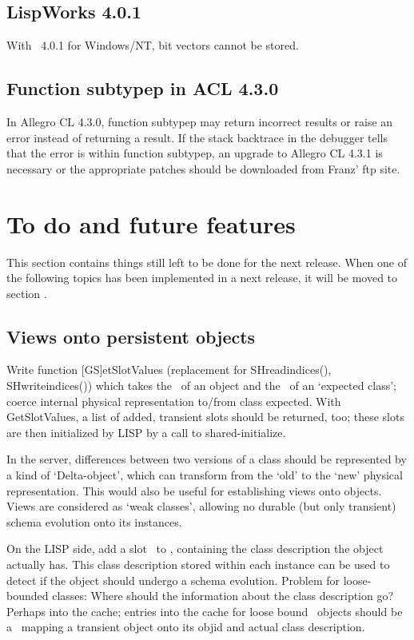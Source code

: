 \subsection{LispWorks 4.0.1}

With \lwcl\ 4.0.1 for Windows/NT, bit vectors cannot be stored.

\subsection{Function subtypep in ACL 4.3.0}

In Allegro CL 4.3.0, function subtypep may return incorrect results or
raise an error instead of returning a result. If the stack backtrace
in the debugger tells that the error is within function subtypep,
an upgrade to Allegro CL 4.3.1 is necessary or the appropriate
patches should be downloaded from Franz' ftp site.

\section{To do and future features}

This section contains things still left to be done for the next
release. When one of the following topics has been implemented in a
next release, it will be moved to section .

\subsection{Views onto persistent objects}%
\label{sec:Views}

Write function [GS]etSlotValues (replacement for
SH\us{}read\us{}indices(), SH\us{}write\us{}indices()) which takes the
\objid\ of an object and the \objid\ of an `expected class'; coerce
internal physical representation to/from class expected. With
GetSlotValues, a list of added, transient slots should be returned,
too; these slots are then initialized by LISP by a call to
shared-initialize.

In the server, differences between two versions of a class should be
represented by a kind of `Delta-object', which can transform from the
`old' to the `new' physical representation. This would also be useful
for establishing views onto objects. Views are considered as `weak
classes', allowing no durable (but only transient) schema evolution
onto its instances.

On the LISP side, add a slot \ to
, containing the class description the
object actually has. This class description stored within each
instance can be used to detect if the object should undergo a schema
evolution.  Problem for loose-bounded classes: Where should the
information about the class description go? Perhaps into the cache;
entries into the cache for loose bound \clos\ objects should be a
\ mapping a transient object onto its objid and actual
class description.

